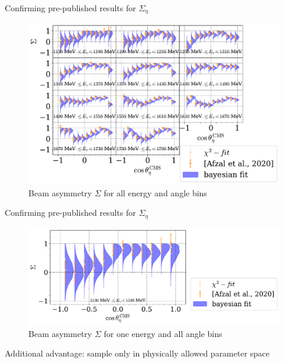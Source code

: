 \documentclass[11pt,aspectratio=169,dvipsnames]{beamer}
\begin{document}
\begin{frame}{Confirming pre-published results for $\Sigma_\eta$}
	\begin{figure}
		\centering
		\includegraphics[width=.79\linewidth]{../bayes/realdeal/sigma_eta_alt.pdf}
		\caption*{Beam asymmetry $\Sigma$ for all energy and angle bins}
	\end{figure}
\end{frame}
\begin{frame}{Confirming pre-published results for $\Sigma_\eta$}
	\begin{figure}
		\centering
		\includegraphics[width=\linewidth]{sigma_eta_bin.pdf}
		\caption*{Beam asymmetry $\Sigma$ for one energy and all angle bins}
	\end{figure}
Additional advantage: sample only in physically allowed parameter space
\end{frame}
\end{document}
